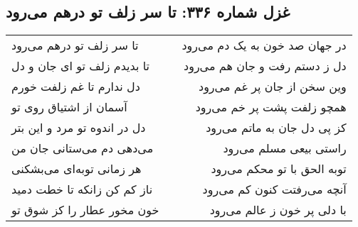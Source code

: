 \begin{center}
\section*{غزل شماره ۳۳۶: تا سر زلف تو درهم می‌رود}
\label{sec:336}
\begin{longtable}{l p{0.5cm} r}
تا سر زلف تو درهم می‌رود
&&
در جهان صد خون به یک دم می‌رود
\\
تا بدیدم زلف تو ای جان و دل
&&
دل ز دستم رفت و جان هم می‌رود
\\
دل ندارم تا غم زلفت خورم
&&
وین سخن از جان پر غم می‌رود
\\
آسمان از اشتیاق روی تو
&&
همچو زلفت پشت پر خم می‌رود
\\
دل در اندوه تو مرد و این بتر
&&
کز پی دل جان به ماتم می‌رود
\\
می‌دهی دم می‌ستانی جان من
&&
راستی بیعی مسلم می‌رود
\\
هر زمانی توبه‌ای می‌بشکنی
&&
توبه الحق با تو محکم می‌رود
\\
ناز کم کن زانکه تا خطت دمید
&&
آنچه می‌رفتت کنون کم می‌رود
\\
خون مخور عطار را کز شوق تو
&&
با دلی پر خون ز عالم می‌رود
\\
\end{longtable}
\end{center}
